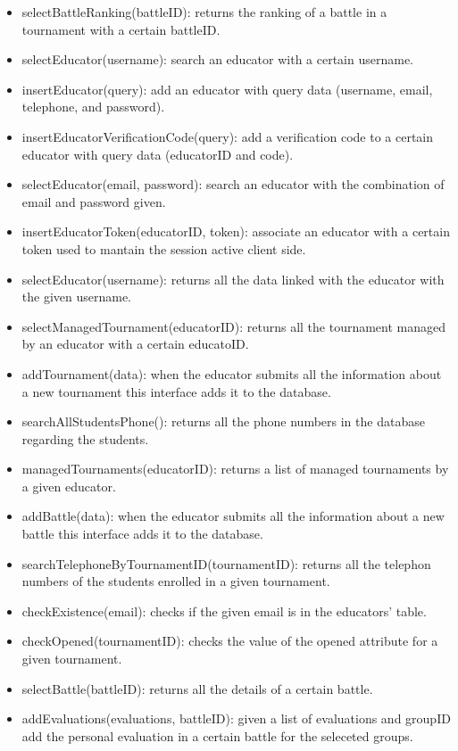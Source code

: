 \documentclass[12pt, a4paper]{report}
\begin{document}
\begin{itemize}
        \item selectBattleRanking(battleID): returns the ranking of a battle in a tournament with a certain battleID. 
        \item selectEducator(username): search an educator with a certain username. 
        \item insertEducator(query): add an educator with query data (username, email, telephone, and password). 
        \item insertEducatorVerificationCode(query): add a verification code to a certain educator with query data (educatorID and code). 
        \item selectEducator(email, password): search an educator with the combination of email and password given. 
        \item insertEducatorToken(educatorID, token): associate an educator with a certain token used to mantain the session active client side. 
        \item selectEducator(username): returns all the data linked with the educator with the given username. 
        \item selectManagedTournament(educatorID): returns all the tournament managed by an educator with a certain educatoID. 
        \item addTournament(data): when the educator submits all the information about a new tournament this interface adds it to the database. 
        \item searchAllStudentsPhone(): returns all the phone numbers in the database regarding the students. 
        \item managedTournaments(educatorID): returns a list of managed tournaments by a given educator. 
        \item addBattle(data): when the educator submits all the information about a new battle this interface adds it to the database. 
        \item searchTelephoneByTournamentID(tournamentID): returns all the telephon numbers of the students enrolled in a given tournament. 
        \item checkExistence(email): checks if the given email is in the educators' table. 
        \item checkOpened(tournamentID): checks the value of the opened attribute for a given tournament. 
        \item selectBattle(battleID): returns all the details of a certain battle. 
        \item addEvaluations(evaluations, battleID): given a list of evaluations and groupID add the personal evaluation in a certain battle for the seleceted groups. 
    \end{itemize}
\end{document}
